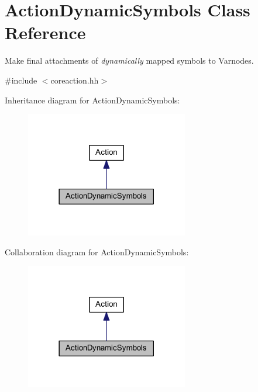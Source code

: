 \hypertarget{class_action_dynamic_symbols}{}\section{Action\+Dynamic\+Symbols Class Reference}
\label{class_action_dynamic_symbols}


Make final attachments of {\itshape dynamically} mapped symbols to Varnodes.  




{\ttfamily \#include $<$coreaction.\+hh$>$}



Inheritance diagram for Action\+Dynamic\+Symbols\+:
\nopagebreak
\begin{figure}[H]
\begin{center}
\leavevmode
\includegraphics[width=201pt]{class_action_dynamic_symbols__inherit__graph}
\end{center}
\end{figure}


Collaboration diagram for Action\+Dynamic\+Symbols\+:
\nopagebreak
\begin{figure}[H]
\begin{center}
\leavevmode
\includegraphics[width=201pt]{class_action_dynamic_symbols__coll__graph}
\end{center}
\end{figure}
